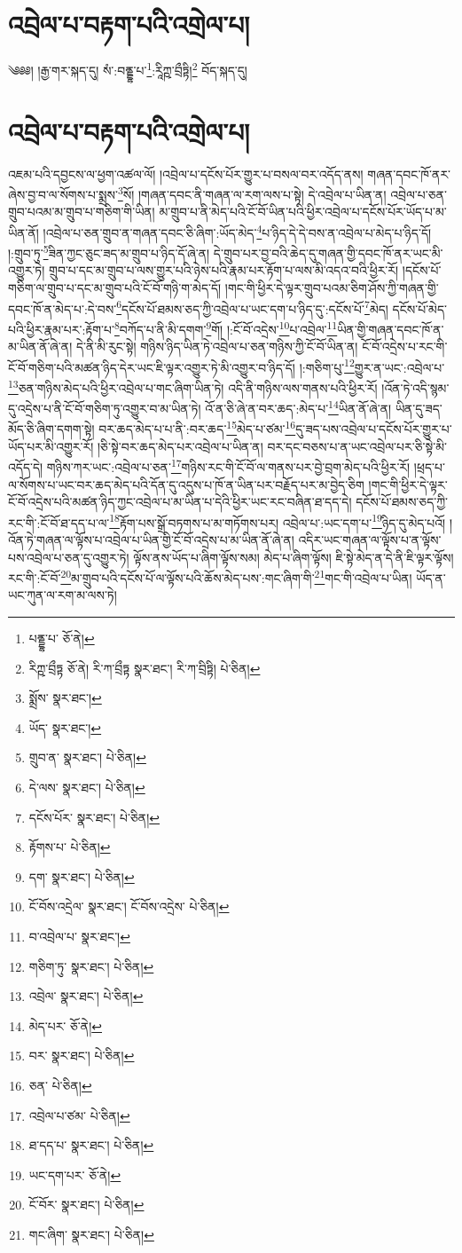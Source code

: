 \setcounter{footnote}{0} 
\chapter{འབྲེལ་པ་བརྟག་པའི་འགྲེལ་པ།}༄༅༅། །རྒྱ་གར་སྐད་དུ། སཾ་:བནྡྷ་པ་\footnote{པནྡྷ་པ་  ཅོ་ནེ། }:རཱིཀྵ་བྲྀཏྟི།\footnote{རིཀྵ་བྲྀཏྟ  ཅོ་ནེ། རི་ཀ་བྲྀཏྟ  སྣར་ཐང་། རི་ཀ་བྲིཏྟི།  པེ་ཅིན། } བོད་སྐད་དུ། \chapter{འབྲེལ་པ་བརྟག་པའི་འགྲེལ་པ།} འཇམ་པའི་དབྱངས་ལ་ཕྱག་འཚལ་ལོ། །འབྲེལ་པ་དངོས་པོར་གྱུར་པ་བསལ་བར་འདོད་ནས། གཞན་དབང་ཁོ་ནར་ཞེས་བྱ་བ་ལ་སོགས་པ་སྨྲས་\footnote{སྨྲོས་  སྣར་ཐང་། }སོ། །གཞན་དབང་ནི་གཞན་ལ་རག་ལས་པ་སྟེ། དེ་འབྲེལ་པ་ཡིན་ན། འབྲེལ་པ་ཅན་གྲུབ་པའམ་མ་གྲུབ་པ་གཅིག་གི་ཡིན། མ་གྲུབ་པ་ནི་མེད་པའི་ངོ་བོ་ཡིན་པའི་ཕྱིར་འབྲེལ་པ་དངོས་པོར་ཡོད་པ་མ་ཡིན་ནོ། །འབྲེལ་པ་ཅན་གྲུབ་ན་གཞན་དབང་ཅི་ཞིག་:ཡོད་མེད་\footnote{ཡོད་  སྣར་ཐང་། }པ་ཉིད་དེ་དེ་བས་ན་འབྲེལ་པ་མེད་པ་ཉིད་དོ། །:གྲུབ་ཏུ་\footnote{གྲུབ་ན་  སྣར་ཐང་།  པེ་ཅིན། }ཟིན་ཀྱང་ཅུང་ཟད་མ་གྲུབ་པ་ཉིད་དོ་ཞེ་ན། དེ་གྲུབ་པར་བྱ་བའི་ཆེད་དུ་གཞན་གྱི་དབང་ཁོ་ནར་ཡང་མི་འགྱུར་ཏེ། གྲུབ་པ་དང་མ་གྲུབ་པ་ལས་གྱུར་པའི་ཉེས་པའི་རྣམ་པར་རྟོག་པ་ལས་མི་འདའ་བའི་ཕྱིར་རོ། །དངོས་པོ་གཅིག་ལ་གྲུབ་པ་དང་མ་གྲུབ་པའི་ངོ་བོ་གཉི་ག་མེད་དོ། །གང་གི་ཕྱིར་དེ་ལྟར་གྲུབ་པའམ་ཅིག་ཤོས་ཀྱི་གཞན་གྱི་དབང་ཁོ་ན་མེད་པ་:དེ་བས་\footnote{དེ་ལས་  སྣར་ཐང་།  པེ་ཅིན། }དངོས་པོ་ཐམས་ཅད་ཀྱི་འབྲེལ་པ་ཡང་དག་པ་ཉིད་དུ་:དངོས་པོ་\footnote{དངོས་པོར་  སྣར་ཐང་།  པེ་ཅིན། }མེད། དངོས་པོ་མེད་པའི་ཕྱིར་རྣམ་པར་:རྟོག་པ་\footnote{རྟོགས་པ་  པེ་ཅིན། }བཀོད་པ་ནི་མི་དགག་\footnote{དག་  སྣར་ཐང་།  པེ་ཅིན། }གོ། །:ངོ་བོ་འདྲེས་\footnote{ངོ་བོས་འདྲེལ་  སྣར་ཐང་། ངོ་བོས་འདྲེས་  པེ་ཅིན། }པ་འབྲེལ་\footnote{བ་འབྲེལ་པ་  སྣར་ཐང་། }ཡིན་གྱི་གཞན་དབང་ཁོ་ན་མ་ཡིན་ནོ་ཞེ་ན། དེ་ནི་མི་རུང་སྟེ། གཉིས་ཉིད་ཡིན་ཏེ་འབྲེལ་པ་ཅན་གཉིས་ཀྱི་ངོ་བོ་ཡིན་ན། ངོ་བོ་འདྲེས་པ་རང་གི་ངོ་བོ་གཅིག་པའི་མཚན་ཉིད་དེར་ཡང་ཇི་ལྟར་འགྱུར་ཏེ་མི་འགྱུར་བ་ཉིད་དོ། །:གཅིག་པུ་\footnote{གཅིག་ཏུ་  སྣར་ཐང་།  པེ་ཅིན། }གྱུར་ན་ཡང་:འབྲེལ་པ་\footnote{འབྲེལ་  སྣར་ཐང་།  པེ་ཅིན། }ཅན་གཉིས་མེད་པའི་ཕྱིར་འབྲེལ་པ་གང་ཞིག་ཡིན་ཏེ། འདི་ནི་གཉིས་ལས་གནས་པའི་ཕྱིར་རོ། །འོན་ཏེ་འདི་སྙམ་དུ་འདྲེས་པ་ནི་ངོ་བོ་གཅིག་ཏུ་འགྱུར་བ་མ་ཡིན་ཏེ། འོ་ན་ཅི་ཞེ་ན་བར་ཆད་:མེད་པ་\footnote{མེད་པར་  ཅོ་ནེ། }ཡིན་ནོ་ཞེ་ན། ཡིན་དུ་ཟད་མོད་ཅི་ཞིག་དགག་སྟེ། བར་ཆད་མེད་པ་པ་ནི་:བར་ཆད་\footnote{བར་  སྣར་ཐང་།  པེ་ཅིན། }མེད་པ་ཙམ་\footnote{ཅན་  པེ་ཅིན། }དུ་ཟད་པས་འབྲེལ་པ་དངོས་པོར་གྱུར་པ་ཡོད་པར་མི་འགྱུར་རོ། །ཅི་སྟེ་བར་ཆད་མེད་པར་འབྲེལ་པ་ཡིན་ན། བར་དང་བཅས་པ་ན་ཡང་འབྲེལ་པར་ཅི་སྟེ་མི་འདོད་དེ། གཉིས་ཀར་ཡང་:འབྲེལ་པ་ཅན་\footnote{འབྲེལ་པ་ཙམ་  པེ་ཅིན། }གཉིས་རང་གི་ངོ་བོ་ལ་གནས་པར་བྱེ་བྲག་མེད་པའི་ཕྱིར་རོ། །ཕྲད་པ་ལ་སོགས་པ་ཡང་བར་ཆད་མེད་པའི་དོན་དུ་འདུས་པ་ཁོ་ན་ཡིན་པར་བརྗོད་པར་མ་བྱེད་ཅིག །གང་གི་ཕྱིར་དེ་ལྟར་ངོ་བོ་འདྲེས་པའི་མཚན་ཉིད་ཀྱང་འབྲེལ་པ་མ་ཡིན་པ་དེའི་ཕྱིར་ཡང་རང་བཞིན་ཐ་དད་དེ། དངོས་པོ་ཐམས་ཅད་ཀྱི་རང་གི་:ངོ་བོ་ཐ་དད་པ་ལ་\footnote{ཐ་དད་པ་  སྣར་ཐང་།  པེ་ཅིན། }རྟོག་པས་སྒྲོ་བཏགས་པ་མ་གཏོགས་པར། འབྲེལ་པ་:ཡང་དག་པ་\footnote{ཡང་དག་པར་  ཅོ་ནེ། }ཉིད་དུ་མེད་པའོ། །འོན་ཏེ་གཞན་ལ་ལྟོས་པ་འབྲེལ་པ་ཡིན་གྱི་ངོ་བོ་འདྲེས་པ་མ་ཡིན་ནོ་ཞེ་ན། འདིར་ཡང་གཞན་ལ་ལྟོས་པ་ན་ལྟོས་པས་འབྲེལ་པ་ཅན་དུ་འགྱུར་ཏེ། ལྟོས་ནས་ཡོད་པ་ཞིག་ལྟོས་སམ། མེད་པ་ཞིག་ལྟོས། ཇི་སྟེ་མེད་ན་དེ་ནི་ཇི་ལྟར་ལྟོས། རང་གི་:ངོ་བོ་\footnote{ངོ་བོར་  སྣར་ཐང་།  པེ་ཅིན། }མ་གྲུབ་པའི་དངོས་པོ་ལ་ལྟོས་པའི་ཆོས་མེད་པས་:གང་ཞིག་གི་\footnote{གང་ཞིག་  སྣར་ཐང་།  པེ་ཅིན། }གང་གི་འབྲེལ་པ་ཡིན། ཡོད་ན་ཡང་ཀུན་ལ་རག་མ་ལས་ཏེ། 